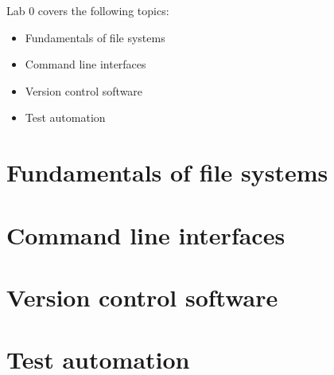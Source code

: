 \documentclass{scrreprt}
\begin{document}
Lab 0 covers the following topics:
\begin{itemize}
 \item Fundamentals of file systems
 \item Command line interfaces
 \item Version control software
 \item Test automation
\end{itemize} 

\chapter{Fundamentals of file systems}

\chapter{Command line interfaces}

\chapter{Version control software}

\chapter{Test automation}
\end{document}
